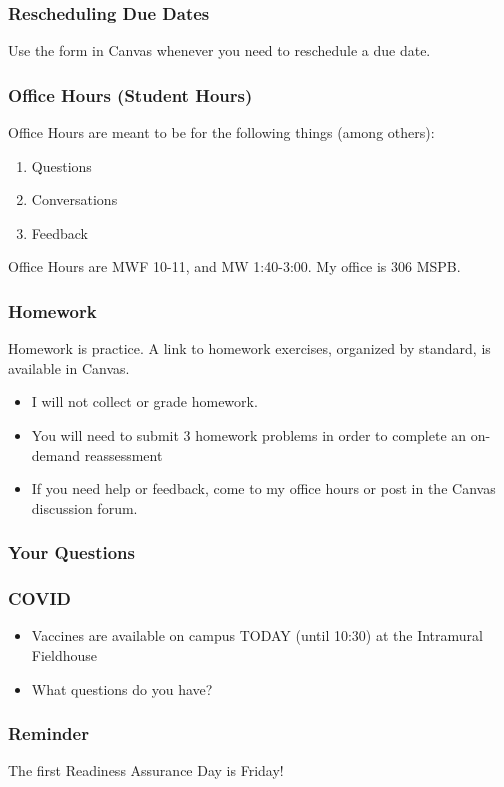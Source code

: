 \documentclass[aspectration=1610]{beamer}
\begin{document}
\begin{frame}\frametitle{Rescheduling Due Dates}

Use the form in Canvas whenever you need to reschedule a due date.

\end{frame}


\begin{frame}\frametitle{Office Hours (Student Hours)}
Office Hours are meant to be for the following things (among others):
\begin{enumerate}
\item Questions
\item Conversations
\item Feedback
\end{enumerate}

\vspace{0.2in}

Office Hours are MWF 10-11, and MW 1:40-3:00.  My office is 306 MSPB.
\end{frame}



\begin{frame}\frametitle{Homework}
Homework is practice.  A link to homework exercises, organized by standard, is available in Canvas.
\begin{itemize}
\item I will not collect or grade homework.
\item You will need to submit 3 homework problems in order to complete an on-demand reassessment
\item If you need help or feedback, come to my office hours or post in the Canvas discussion forum.
\end{itemize}
\end{frame}

\begin{frame}\frametitle{Your Questions}

\end{frame}

\begin{frame}\frametitle{COVID}

\begin{itemize}
\item Vaccines are available on campus TODAY (until 10:30) at the Intramural Fieldhouse
\item What questions do you have?
\end{itemize}

\end{frame}


\begin{frame}\frametitle{Reminder}
The first Readiness Assurance Day is Friday!
\end{frame}
\end{document}
